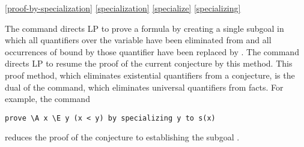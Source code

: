 \ref{proof-by-specialization}
\ref{specialization}
\ref{specialize}
\ref{specializing}

The command  directs LP to prove a formula
 by creating a single subgoal in which all
 quantifiers over the variable 
 have been eliminated from  and all occurrences of  bound by 
those quantifier have been replaced by .  
\p
The command  directs LP to resume the proof
of the current conjecture by this method.
\p
This proof method, which eliminates existential quantifiers from a conjecture,
is the dual of the  command, which eliminates universal
quantifiers from facts.
\p
For example, the command
\begin{verbatim}
prove \A x \E y (x < y) by specializing y to s(x)
\end{verbatim}
reduces the proof of the conjecture to establishing the subgoal .

